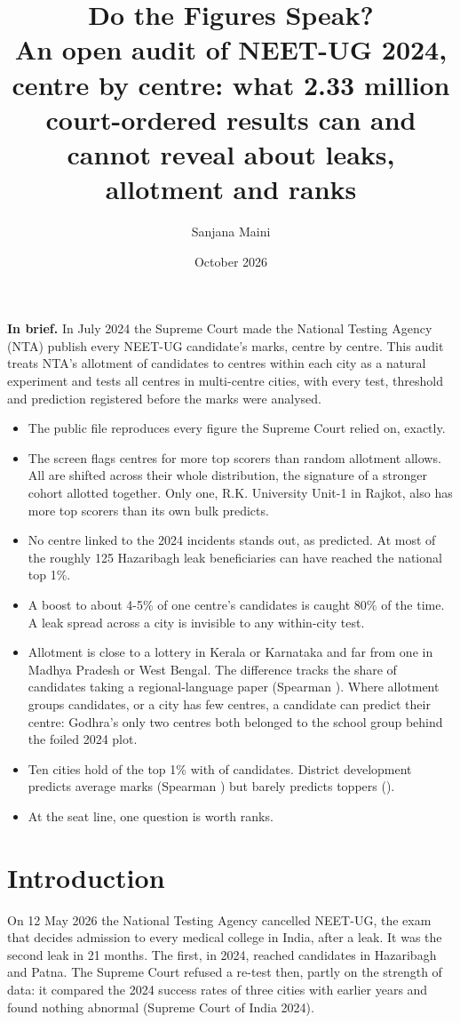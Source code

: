 \documentclass[11pt]{article}
\title{\sffamily\color{accent}\textbf{Do the Figures Speak?}\\[4pt]\large An open audit of NEET-UG 2024, centre by centre: what 2.33 million court-ordered results can and cannot reveal about leaks, allotment and ranks}
\author{Sanjana Maini}
\date{October 2026}
\newcommand{\inbrief}[1]{\noindent\colorbox{soft}{\parbox{\dimexpr\linewidth-2\fboxsep}{\small #1}}}
\begin{document}
\maketitle

\inbrief{%
\textbf{In brief.} In July 2024 the Supreme Court made the National Testing Agency (NTA) publish every NEET-UG candidate's marks, centre by centre. This audit treats NTA's allotment of candidates to centres within each city as a natural experiment and tests all \ScreenCentres{} centres in multi-centre cities, with every test, threshold and prediction registered before the marks were analysed.
\begin{itemize}[leftmargin=1.2em]
\item The public file reproduces every figure the Supreme Court relied on, exactly.
\item The screen flags \FlagsLayerTwo{} centres for more top scorers than random allotment allows. All \FlagsLayerTwo{} are shifted across their whole distribution, the signature of a stronger cohort allotted together. Only one, R.K. University Unit-1 in Rajkot, also has more top scorers than its own bulk predicts.
\item No centre linked to the 2024 incidents stands out, as predicted. At most \CourtHazaribaghTopOne{} of the roughly 125 Hazaribagh leak beneficiaries can have reached the national top 1\%.
\item A boost to about 4-5\% of one centre's candidates is caught 80\% of the time. A leak spread across a city is invisible to any within-city test.
\item Allotment is close to a lottery in Kerala or Karnataka and far from one in Madhya Pradesh or West Bengal. The difference tracks the share of candidates taking a regional-language paper (Spearman \MediumSpearman). Where allotment groups candidates, or a city has few centres, a candidate can predict their centre: Godhra's only two centres both belonged to the school group behind the foiled 2024 plot.
\item Ten cities hold \GeoTopOneZeroShareTopOne{} of the top 1\% with \GeoTopOneZeroShareCandidates{} of candidates. District development predicts average marks (Spearman \GeoDevMeanMarksRho) but barely predicts toppers (\GeoDevTopOneRateRho).
\item At the seat line, one question is worth \FrFiveSevenSevenRanksFive{} ranks.
\end{itemize}}

\section{Introduction}
On 12 May 2026 the National Testing Agency cancelled NEET-UG, the exam that decides admission to every medical college in India, after a leak. It was the second leak in 21 months. The first, in 2024, reached candidates in Hazaribagh and Patna. The Supreme Court refused a re-test then, partly on the strength of data: it compared the 2024 success rates of three cities with earlier years and found nothing abnormal (Supreme Court of India 2024).
\end{document}

